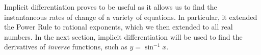 Implicit differentiation proves to be useful as it allows us to find the instantaneous rates of change of a variety of equations. In particular, it extended the Power Rule to rational exponents, which we then extended to all real numbers. In the next section, implicit differentiation will be used to find the derivatives of \textit{inverse} functions, such as $y=\sin^{-1} x$.

%
%
%
%
%
%
%
%
%
%
%
